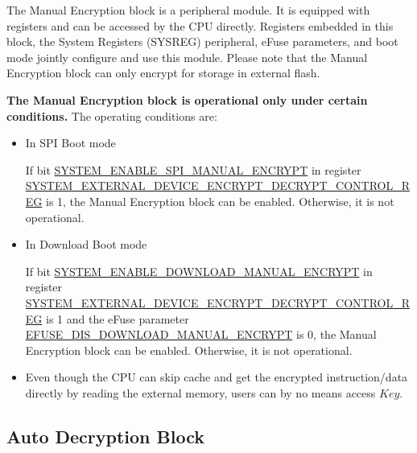 \documentclass[main\_\_EN.tex]{subfiles}
\begin{document}
The Manual Encryption block is a peripheral module. It is equipped with registers and can be accessed by the CPU directly. Registers embedded in this block, the System Registers (SYSREG) peripheral, eFuse parameters, and boot mode jointly configure and use this module. Please note that the Manual Encryption block can only encrypt for storage in external flash.

\textbf{ The Manual Encryption block is operational only under certain conditions.} The operating conditions are:

\begin{itemize}

    \item In SPI Boot mode
    
    If bit \hyperref[fielddesc:SYSTEMENABLESPIMANUALENCRYPT]{SYSTEM\_ENABLE\_SPI\_MANUAL\_ENCRYPT} in register\\ \hyperref[regdesc:SYSTEMEXTERNALDEVICEENCRYPTDECRYPTCONTROLREG]{SYSTEM\_EXTERNAL\_DEVICE\_ENCRYPT\_DECRYPT\_CONTROL\_REG} is 1, the Manual Encryption block can be enabled. Otherwise, it is not operational.
    
    \item In Download Boot mode
    
    If bit \hyperref[fielddesc:SYSTEMENABLEDOWNLOADMANUALENCRYPT]{SYSTEM\_ENABLE\_DOWNLOAD\_MANUAL\_ENCRYPT} in register\\ \hyperref[regdesc:SYSTEMEXTERNALDEVICEENCRYPTDECRYPTCONTROLREG]{SYSTEM\_EXTERNAL\_DEVICE\_ENCRYPT\_DECRYPT\_CONTROL\_REG} is 1 and the eFuse parameter\\ \hyperref[fielddesc:EFUSEDISDOWNLOADMANUALENCRYPT]{EFUSE\_DIS\_DOWNLOAD\_MANUAL\_ENCRYPT} is 0, the Manual Encryption block can be enabled. Otherwise, it is not operational.
    
\end{itemize}

\begin{tiplisting}
\vspace{-2em}
\begin{itemize}
\item Even though the CPU can skip cache and get the encrypted instruction/data directly by reading the external memory, users can by no means access \begin{math}Key\end{math}.
\end{itemize}
\end{tiplisting}

\subsection{Auto Decryption Block}
\end{document}
